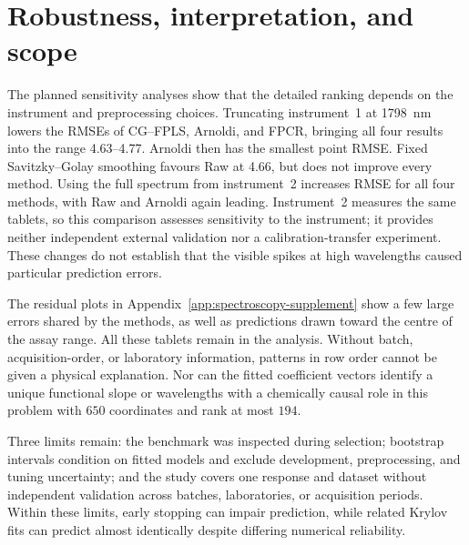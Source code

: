 \section{Robustness, interpretation, and scope}
\label{sec:spectroscopy-scope}

The planned sensitivity analyses show that the detailed ranking depends on
the instrument and preprocessing choices.  Truncating instrument~1 at
1798~nm lowers the RMSEs of CG--FPLS, Arnoldi, and FPCR, bringing all four
results into the range 4.63--4.77.  Arnoldi then has the smallest point RMSE.
Fixed Savitzky--Golay smoothing favours Raw at 4.66, but does not improve every
method.  Using the full spectrum from instrument~2 increases RMSE for all
four methods, with Raw and Arnoldi again leading.  Instrument~2 measures the
same tablets, so this comparison assesses sensitivity to the instrument;
it provides neither independent external validation nor a calibration-transfer
experiment.  These changes do not establish that the visible spikes at high
wavelengths caused particular prediction errors.

The residual plots in Appendix~\ref{app:spectroscopy-supplement} show a few
large errors shared by the methods, as well as predictions drawn toward the
centre of the assay range.  All these tablets remain in the analysis.
Without batch, acquisition-order, or laboratory information, patterns in row
order cannot be given a physical explanation.  Nor can the fitted coefficient
vectors identify a unique functional slope or wavelengths with a chemically
causal role in this problem with $650$ coordinates and rank at most $194$.
\par

Three limits remain: the benchmark was inspected during selection; bootstrap
intervals condition on fitted models and exclude development, preprocessing,
and tuning uncertainty; and the study covers one response and dataset without
independent validation across batches, laboratories, or acquisition periods.
Within these limits, early stopping can impair prediction, while related
Krylov fits can predict almost identically despite differing numerical reliability.
